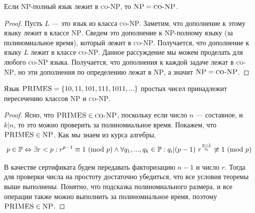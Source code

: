         
    \begin{Thm}
        Если \textsc{NP}-полный язык лежит в \textsc{co-NP}, то $\textsc{NP} = \textsc{co-NP}$.
    \end{Thm}

    \begin{proof}
        Пусть $L$ --- это язык из класса \textsc{co-NP}. Заметим, что дополнение к этому языку лежит в классе \textsc{NP}. Сведем это дополнение к \textsc{NP}-полному языку (за полиномиальное время), который лежит в \textsc{co-NP}. Получается, что дополнение к языку $L$ лежит в классе \textsc{co-NP}. Данное рассуждение мы можем проделать для любого \textsc{co-NP} языка. Получается, что дополнения к каждой задаче лежат в \textsc{co-NP}, но эти дополнения по определению лежат в \textsc{NP}, а значит $\textsc{NP} = \textsc{co-NP}$.
    \end{proof}



    \begin{Thm}
        Язык $\textsc{PRIMES} = \{10, 11, 101, 111, 1011, ...\}$ простых чисел принадлежит пересечению классов \textsc{NP} и \textsc{co-NP}.
    \end{Thm}

    \begin{proof}
        Ясно, что $\textsc{PRIMES} \in \textsc{co-NP}$, поскольку если число $n$ --- составное, и $k | n$, то это можно проверить за полиномиальное время.
        Покажем, что $\textsc{PRIMES} \in \textsc{NP}$. Как мы знаем из курса алгебры,
        \[p \in \mathbb{P} \Leftrightarrow \exists r < p : r^{p - 1} \equiv 1 \ (\mathrm{mod}\ p) \wedge \forall q_1, ..., q_k \in \mathbb{P} : q_i | (p - 1) \ r^{\frac{p - 1}{q_i}} \not\equiv 1 \ (\mathrm{mod}\ p)\]

        В качестве сертификата будем передавать факторизацию $n - 1$ и число $r$.
        Тогда для проверки числа на простоту достаточно убедиться, что все условия теоремы выше выполнены.
        Понятно, что подсказка полиномиального размера, и все операции также можно выполнить за полиномиальное время, поэтому $\textsc{PRIMES} \in \textsc{NP}$.
    \end{proof}
    
